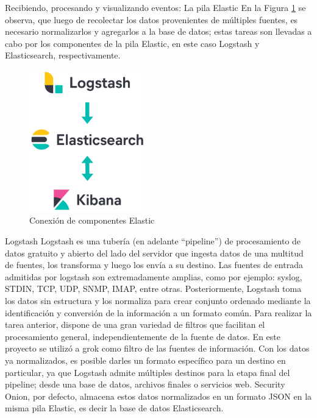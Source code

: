    \pagebreak
   \begin{subsection}{Recibiendo, procesando y visualizando eventos: La pila Elastic}
   En la Figura \ref{fig:figura_20_conexion_comp_elastic} se observa, que luego de recolectar los datos provenientes de múltiples fuentes, es necesario normalizarlos y agregarlos a la base de datos; estas tareas son llevadas a cabo por los componentes de la pila Elastic, en este caso Logstash y Elasticsearch, respectivamente. 

   \begin{figure}[H]
        \centering
        \includegraphics[width=0.45\textwidth]{./iteracion_1_imagenes/figura_20_conexion_comp_elastic.png}
        \caption{Conexión de componentes Elastic}
        \label{fig:figura_20_conexion_comp_elastic}
    \end{figure}
        
   \end{subsection}
   \begin{subsubsection}{Logstash}
        Logstash es una tubería (en adelante “pipeline”) de procesamiento de datos gratuito y abierto del lado del servidor que ingesta datos de una multitud de fuentes, los transforma y luego los envía a su destino. Las fuentes de entrada admitidas por logstash son extremadamente amplias, como por ejemplo: syslog, STDIN, TCP, UDP, SNMP, IMAP, entre otras. Posteriormente, Logstash toma los datos sin estructura y los normaliza para crear conjunto ordenado mediante la identificación y conversión de la información a un formato común. Para realizar la tarea anterior, dispone de una gran variedad de filtros que facilitan el procesamiento general, independientemente de la fuente de datos. En este proyecto se utilizó a grok \cite{grok} como filtro de las fuentes de información. Con los datos ya normalizados, es posible darles un formato específico para un destino en particular, ya que Logstash admite múltiples destinos para la etapa final del pipeline; desde una base de datos, archivos finales o servicios web. Security Onion, por defecto, almacena estos datos normalizados en un formato JSON en la misma pila Elastic, es decir la base de datos Elasticsearch.
   \end{subsubsection}
